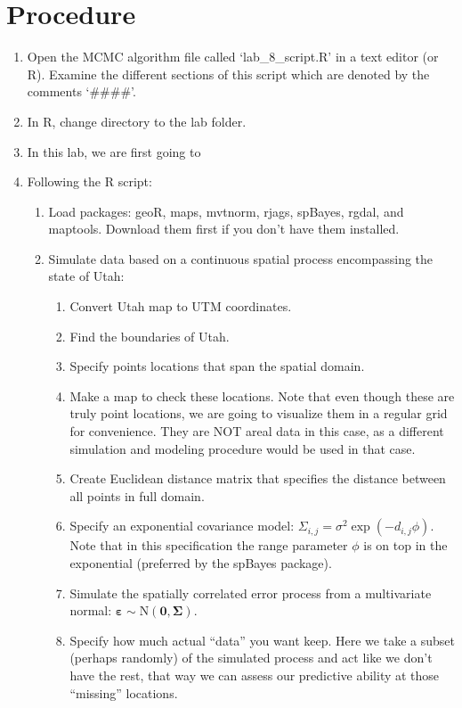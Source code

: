 \documentclass[12pt]{article}
\begin{document}
\section*{Procedure}
\begin{enumerate}
  \item Open the MCMC algorithm file called `lab\_8\_script.R' in a text editor (or R).  Examine the different sections of this script which are denoted by the comments `\#\#\#\#'.  
  \item In R, change directory to the lab folder. 
  \item In this lab, we are first going to   
  \item Following the R script:
  \begin{enumerate}
    \item Load packages:  geoR, maps, mvtnorm, rjags, spBayes, rgdal, and maptools.  Download them first if you don't have them installed.
    \item Simulate data based on a continuous spatial process encompassing the state of Utah:
    \begin{enumerate}
      \item Convert Utah map to UTM coordinates. 
      \item Find the boundaries of Utah. 
      \item Specify points locations that span the spatial domain. 
      \item Make a map to check these locations.  Note that even though these are truly point locations, we are going to visualize them in a regular grid for convenience.  They are NOT areal data in this case, as a different simulation and modeling procedure would be used in that case.
      \item Create Euclidean distance matrix that specifies the distance between all points in full domain. 
      \item Specify an exponential covariance model: $\Sigma_{i,j}=\sigma^2 \exp(-d_{i,j} \phi)$.  Note that in this specification the range parameter $\phi$ is on top in the exponential (preferred by the spBayes package).   
      \item Simulate the spatially correlated error process from a multivariate normal: $\boldsymbol\varepsilon \sim \text{N}(\mathbf{0}, \boldsymbol\Sigma)$.  
      \item Specify how much actual ``data'' you want keep.  Here we take a subset (perhaps randomly) of the simulated process and act like we don't have the rest, that way we can assess our predictive ability at those ``missing'' locations.

\end{enumerate}
\end{enumerate}
\end{enumerate}
\end{document}
